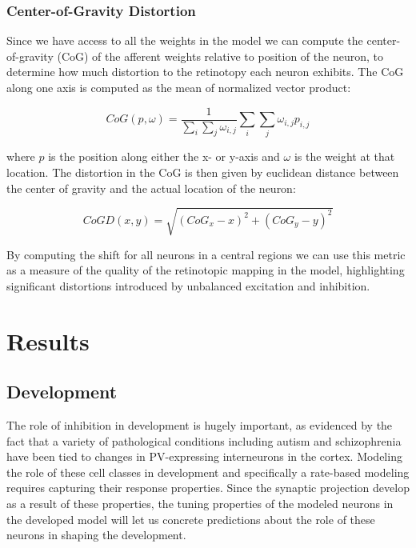 \subsubsection{Center-of-Gravity Distortion}

Since we have access to all the weights in the model we can compute
the center-of-gravity (CoG) of the afferent weights relative to
position of the neuron, to determine how much distortion to the
retinotopy each neuron exhibits. The CoG along one axis is computed as
the mean of normalized vector product:

\begin{equation}
  CoG(p, \omega) = \frac{1}{\sum_i \sum_j \omega_{i, j}} \sum_i \sum_j \omega_{i,j} p_{i,j}  
\end{equation}

where $p$ is the position along either the x- or y-axis and $\omega$
is the weight at that location. The distortion in the CoG is then
given by euclidean distance between the center of gravity and the
actual location of the neuron:

\begin{equation}
  CoGD(x, y) = \sqrt{(CoG_x-x)^2 + (CoG_y-y)^2}
\end{equation}

By computing the shift for all neurons in a central regions we can use
this metric as a measure of the quality of the retinotopic mapping in
the model, highlighting significant distortions introduced by
unbalanced excitation and inhibition.

\section{Results}

\subsection{Development}

The role of inhibition in development is hugely important, as
evidenced by the fact that a variety of pathological conditions
including autism \citep{Wohr2015} and schizophrenia \citep{Lewis2012}
have been tied to changes in PV-expressing interneurons in the
cortex. Modeling the role of these cell classes in development and
specifically a rate-based modeling requires capturing their response
properties. Since the synaptic projection develop as a result of these
properties, the tuning properties of the modeled neurons in the
developed model will let us concrete predictions about the role of
these neurons in shaping the development.

